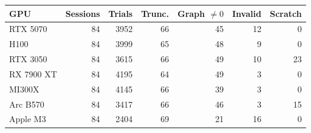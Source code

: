 \begin{tabular}{lrrrrrr}
\toprule
GPU & Sessions & Trials & Trunc. & Graph $\ne0$ & Invalid & Scratch \\
\midrule
RTX 5070 & 84 & 3952 & 66 & 45 & 12 & 0 \\
H100 & 84 & 3999 & 65 & 48 & 9 & 0 \\
RTX 3050 & 84 & 3615 & 66 & 49 & 10 & 23 \\
RX 7900 XT & 84 & 4195 & 64 & 49 & 3 & 0 \\
MI300X & 84 & 4145 & 66 & 39 & 3 & 0 \\
Arc B570 & 84 & 3417 & 66 & 46 & 3 & 15 \\
Apple M3 & 84 & 2404 & 69 & 21 & 16 & 0 \\
\bottomrule
\end{tabular}
